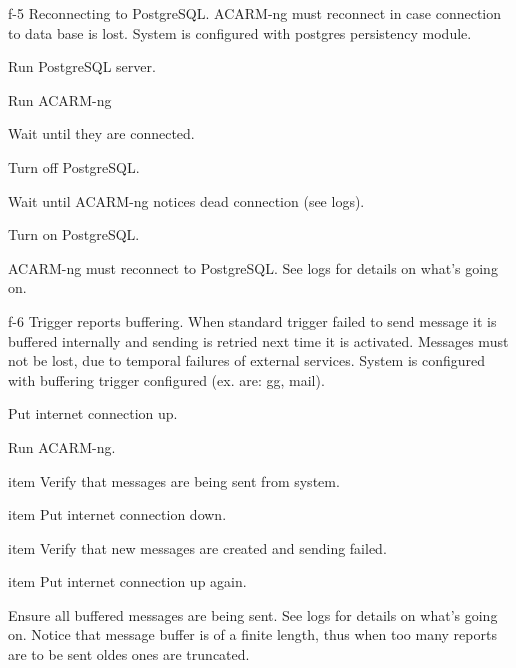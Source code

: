 \testCase
{f-5}
{Reconnecting to PostgreSQL.}
{ACARM-ng must reconnect in case connection to data base is lost.}
{System is configured with postgres persistency module.}
{
\begin{enumerate*}
\item Run PostgreSQL server.
\item Run ACARM-ng
\item Wait until they are connected.
\item Turn off PostgreSQL.
\item Wait until ACARM-ng notices dead connection (see logs).
\item Turn on PostgreSQL.
\end{enumerate*}
}
{ACARM-ng must reconnect to PostgreSQL.}
{See logs for details on what's going on.}


\testCase
{f-6}
{Trigger reports buffering.}
{When standard trigger failed to send message it is buffered internally and sending is retried next time it is activated. Messages must not be lost, due to temporal failures of external services.}
{System is configured with buffering trigger configured (ex. are: gg, mail).}
{
\begin{enumerate*}
\item Put internet connection up.
\item Run ACARM-ng.
\item item Verify that messages are being sent from system.
\item item Put internet connection down.
\item item Verify that new messages are created and sending failed.
\item item Put internet connection up again.
\end{enumerate*}
}
{Ensure all buffered messages are being sent.}
{See logs for details on what's going on. Notice that message buffer is of a finite length, thus when too many reports are to be sent oldes ones are truncated.}
